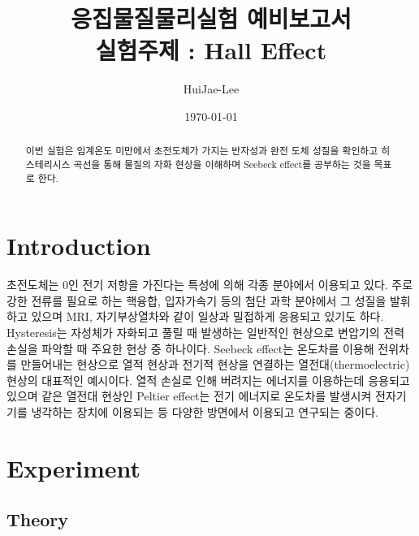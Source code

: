\documentclass[aps,reprint,superscriptaddress,10pt]{revtex4-2}
\begin{document}
\title{응집물질물리실험 예비보고서 \\
\small 실험주제 : Hall Effect}

\author{HuiJae-Lee}


\date{\today}


\begin{abstract}
이번 실험은 임계온도 미만에서 초전도체가 가지는 반자성과 완전 도체 성질을 확인하고
히스테리시스 곡선을 통해 물질의 자화 현상을 이해하며 Seebeck effect를 공부하는 것을
목표로 한다.
\end{abstract}
 
 \maketitle
 
\section[Introduction]{Introduction}
초전도체는 0인 전기 저항을 가진다는 특성에 의해 각종 분야에서 이용되고 있다.
주로 강한 전류를 필요로 하는 핵융합, 입자가속기 등의 첨단 과학 분야에서 그 성질을
발휘하고 있으며 MRI, 자기부상열차와 같이 일상과 밀접하게 응용되고 있기도 하다.
Hysteresis는 자성체가 자화되고 풀릴 때 발생하는 일반적인 현상으로 변압기의 전력 손실을
파악할 때 주요한 현상 중 하나이다. Seebeck effect는 온도차를 이용해 전위차를 만들어내는
현상으로 열적 현상과 전기적 현상을 연결하는 열전대(thermoelectric) 현상의 대표적인
예시이다. 열적 손실로 인해 버려지는 에너지를 이용하는데 응용되고 있으며 같은 열전대 현상인
Peltier effect는 전기 에너지로 온도차를 발생시켜 전자기기를 냉각하는 장치에 이용되는 등
다양한 방면에서 이용되고 연구되는 중이다.
\section{Experiment}

\subsection{Theory}
\end{document}
